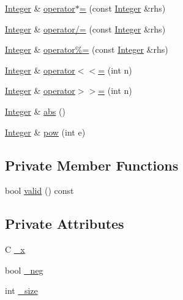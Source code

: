 \begin{DoxyCompactItemize}
\item 
\hyperlink{classInteger}{Integer} \& \hyperlink{classInteger_acf1388dc4ce49c9b7d69b3b6c3a245f7}{operator$\ast$=} (const \hyperlink{classInteger}{Integer} \&rhs)
\item 
\hyperlink{classInteger}{Integer} \& \hyperlink{classInteger_aa13c715bbc68c58c2bd1f1b49a80277e}{operator/=} (const \hyperlink{classInteger}{Integer} \&rhs)
\item 
\hyperlink{classInteger}{Integer} \& \hyperlink{classInteger_a5af44fd8bef5e32fa720b1262045f1b7}{operator\%=} (const \hyperlink{classInteger}{Integer} \&rhs)
\item 
\hyperlink{classInteger}{Integer} \& \hyperlink{classInteger_a4114e69e0da713f50f9cf946cfc70637}{operator$<$$<$=} (int n)
\item 
\hyperlink{classInteger}{Integer} \& \hyperlink{classInteger_a0fbada94834715ce6b91c39e5d41d24f}{operator$>$$>$=} (int n)
\item 
\hyperlink{classInteger}{Integer} \& \hyperlink{classInteger_a28b38b99580e4787e353c6630c3cf063}{abs} ()
\item 
\hyperlink{classInteger}{Integer} \& \hyperlink{classInteger_aae56deca12053a28469749c93c9f7343}{pow} (int e)
\end{DoxyCompactItemize}
\subsection*{Private Member Functions}
\begin{DoxyCompactItemize}
\item 
bool \hyperlink{classInteger_ace6a3dac75762d6c42b42285a426828c}{valid} () const 
\end{DoxyCompactItemize}
\subsection*{Private Attributes}
\begin{DoxyCompactItemize}
\item 
C \hyperlink{classInteger_a19f83aa8d5d86634885eb63d15bcdb6d}{\-\_\-x}
\item 
bool \hyperlink{classInteger_a7efd1cec7874908d43b7d28708754bbf}{\-\_\-neg}
\item 
int \hyperlink{classInteger_aa629450a7423b6e45d6f0906fde12496}{\-\_\-size}
\end{DoxyCompactItemize}
